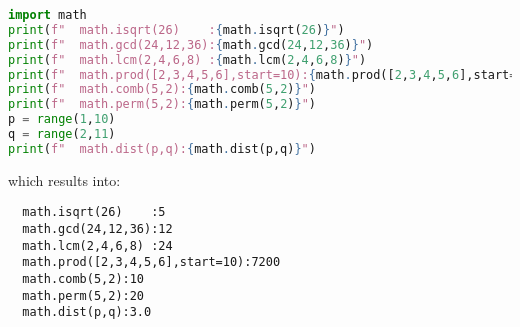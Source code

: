 \documentclass[10pt]{article}
\begin{document}
\begin{itemize}
\begin{lstlisting}[language=python]
import math
print(f"  math.isqrt(26)    :{math.isqrt(26)}")
print(f"  math.gcd(24,12,36):{math.gcd(24,12,36)}")
print(f"  math.lcm(2,4,6,8) :{math.lcm(2,4,6,8)}")
print(f"  math.prod([2,3,4,5,6],start=10):{math.prod([2,3,4,5,6],start=10)}")
print(f"  math.comb(5,2):{math.comb(5,2)}")
print(f"  math.perm(5,2):{math.perm(5,2)}")
p = range(1,10)
q = range(2,11)
print(f"  math.dist(p,q):{math.dist(p,q)}")
\end{lstlisting}

which results into:
\begin{verbatim}
  math.isqrt(26)    :5
  math.gcd(24,12,36):12
  math.lcm(2,4,6,8) :24
  math.prod([2,3,4,5,6],start=10):7200
  math.comb(5,2):10
  math.perm(5,2):20
  math.dist(p,q):3.0
\end{verbatim}

\end{itemize}


\end{document}
